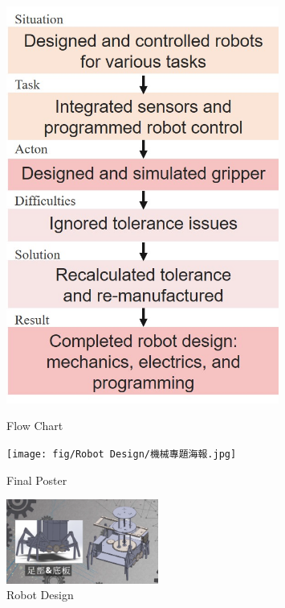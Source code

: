\documentclass[10pt, letterpaper]{article}
\begin{document}
    \begin{figure}[htbp]
        \begin{minipage}[c]{0.33\linewidth}
            \centering
            \includegraphics[width=0.8\textwidth]{fig/Robot Design/機專流程圖.jpg}
            \caption{Flow Chart}
        \end{minipage}%
        \begin{minipage}[c]{0.33\linewidth}
            \centering
            \texttt{[image: fig/Robot Design/機械專題海報.jpg]}
            \caption{Final Poster}
        \end{minipage}%
        \begin{minipage}[c]{0.33\linewidth}
            \centering
            \includegraphics[width=5cm]{fig/Robot Design/機器人設計.png}
            \caption{Robot Design}
        \end{minipage}         


\end{figure}
\end{document}
